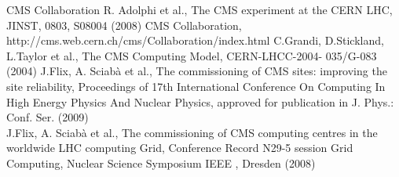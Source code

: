 
\begin{thebibliography}{}
%
%
CMS Collaboration R. Adolphi et al., The CMS experiment at the CERN LHC, JINST, 0803, S08004 (2008)
%
CMS Collaboration, http://cms.web.cern.ch/cms/Collaboration/index.html
%
C.Grandi, D.Stickland, L.Taylor et al., The CMS Computing Model, CERN-LHCC-2004-
035/G-083 (2004)
%
J.Flix, A. Sciab\`a et al., The commissioning of CMS sites: improving the site reliability,  Proceedings of 17th International Conference On Computing In High Energy Physics And Nuclear Physics,  approved for publication in J. Phys.: Conf. Ser. (2009) \\
J.Flix, A. Sciab\`a et al., The commissioning of CMS computing centres in the worldwide LHC computing Grid, Conference Record N29-5 session Grid Computing, Nuclear Science Symposium IEEE , Dresden (2008)


\end{thebibliography}
